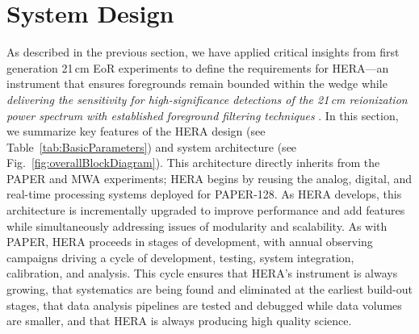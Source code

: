 \documentclass[preprint,11pt]{aastex}
\begin{document}
\section{System Design} \label{sec:design}

\noindent As described in the previous section, we have applied 
critical insights from first generation 21\,cm EoR experiments to define
the requirements for HERA---an instrument that ensures foregrounds remain bounded
within the wedge while \emph{delivering the sensitivity for
high-significance detections of the 21\,cm reionization power spectrum with
established foreground filtering techniques} 
\citep{pober_et_al2014,greig_and_mesinger2015}.
In this section, we summarize key features of the HERA design (see Table~\ref{tab:BasicParameters}) 
and system architecture (see Fig.~\ref{fig:overallBlockDiagram}).
This architecture
directly inherits from the PAPER and MWA experiments; HERA begins by reusing the
analog, digital, and real-time processing systems deployed for PAPER-128.  As HERA develops, this
architecture is incrementally upgraded to improve performance and add features while simultaneously
addressing issues of modularity and scalability.  As with PAPER, HERA proceeds in stages of development,
with annual observing campaigns driving a cycle of development, testing, system integration, calibration, and analysis.
This cycle ensures that HERA's instrument is always growing, that systematics are being found and eliminated at the
earliest build-out stages, that data analysis pipelines are tested and debugged while data volumes are smaller,
and that HERA is always producing high quality science.
\end{document}
